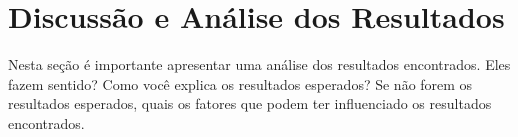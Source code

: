 \section{Discussão e Análise dos Resultados}

Nesta seção é importante apresentar uma análise dos resultados encontrados. Eles fazem sentido? Como você explica os resultados esperados? Se não forem os resultados esperados, quais os fatores que podem ter influenciado os resultados encontrados.
